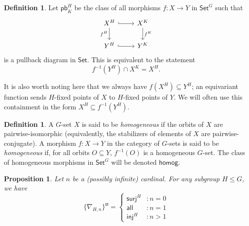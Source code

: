 \documentclass{amsart}
\newcommand{\Set}{\mathsf{Set}}
\newcommand{\GSet}{\Set^G}
\newcommand{\rlp}[1]{{#1}^{\boxslash}}
\newcommand{\all}{\mathsf{all}}
\newcommand{\inj}{\mathsf{inj}}
\newcommand{\surj}{\mathsf{surj}}
\newcommand{\pb}{\mathsf{pb}}
\newcommand{\homog}{\mathsf{homog}}
\numberwithin{equation}{section}
\newtheorem{proposition}[equation]{Proposition}
\theoremstyle{definition}
\newtheorem{definition}[equation]{Definition}
\begin{document}
\begin{definition}
	\label{def:pb}
	Let $\pb_K^H$ be the class of all morphisms $f : X \to Y$ in $\GSet$ such that
	\[\begin{tikzcd}[ampersand replacement=\&]
			{X^H} \& {X^K} \\
			{Y^H} \& {Y^K}
			\arrow[hook, from=1-1, to=1-2]
			\arrow["{f^H}"', from=1-1, to=2-1]
			\arrow["{f^K}", from=1-2, to=2-2]
			\arrow[hook, from=2-1, to=2-2]
		\end{tikzcd}\]
	is a pullback diagram in $\Set$. This is equivalent to the statement
	\begin{equation}
		\label{equivalent characterization of pb}
		f^{-1}(Y^H) \cap X^K = X^H.
	\end{equation}
\end{definition}

It is also worth noting here that we always have $f(X^H) \subseteq Y^H$; an equivariant function sends $H$-fixed points of $X$ to $H$-fixed points of $Y$. We will often use this containment in the form $X^H \subseteq f^{-1}(Y^H)$. 

\begin{definition}
	\label{def:homog}
	A $G$-set $X$ is said to be \emph{homogeneous} if the orbits of $X$ are pairwise-isomorphic (equivalently, the stabilizers of elements of $X$ are pairwise-conjugate). A morphism $f : X \to Y$ in the category of $G$-sets is said to be \emph{homogeneous} if, for all orbits $O \subseteq Y$, $f^{-1}(O)$ is a homogeneous $G$-set. The class of homogeneous morphisms in $\GSet$ will be denoted $\homog$.
\end{definition}

\begin{proposition}\label{prop:nabla boxslash}
	Let $n$ be a (possibly infinite) cardinal. For any subgroup $H \leq G$, we have
	\[\rlp{\{\nabla_{H,n}\}} = \begin{cases} \surj^H &: n = 0 \\ \all &: n = 1 \\ \inj^H &: n > 1 \end{cases}\]
\end{proposition}
\end{document}
